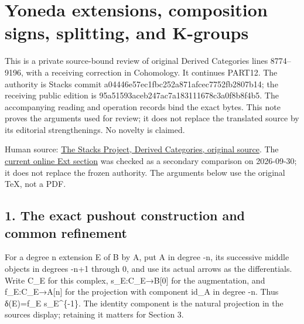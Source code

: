 \section{\texorpdfstring{Yoneda extensions,\allowbreak{} composition signs,\allowbreak{} splitting,\allowbreak{} and K-groups}{Yoneda  composition   and K-groups}}\label{proofs-8774-9196-yoneda-extensions-composition-signs-splitting-and-k-groups}

This is a private source-bound review of original Derived Categories lines 8774–\allowbreak{}9196,\allowbreak{} with a receiving correction in Cohomology. It continues PART12. The authority is Stacks commit a04446e5\allowbreak{}7ec1fbc2\allowbreak{}52a871af\allowbreak{}cec7752f\allowbreak{}b2807b14; the receiving public edition is 95a51593\allowbreak{}aceb247a\allowbreak{}c7a18311\allowbreak{}1678c3a0\allowbreak{}f8b8f4b5. The accompanying reading and operation records bind the exact bytes. This note proves the arguments used for review; it does not replace the translated source by its editorial strengthenings. No novelty is claimed.

Human source:\allowbreak{} \href{https://github.com/stacks/stacks-project/blob/a04446e57ec1fbc252a871afcec7752fb2807b14/derived.tex\#L8774}{The Stacks Project,\allowbreak{} Derived Categories,\allowbreak{} original source}. The \href{https://stacks.math.columbia.edu/tag/06XP}{current online Ext section} was checked as a secondary comparison on 2026-09-30; it does not replace the frozen authority. The arguments below use the original TeX,\allowbreak{} not a PDF.

\subsection{1. The exact pushout construction and common refinement}\label{proofs-8774-9196-the-exact-pushout-construction-and-common-refinement}

For a degree n extension E of B by A,\allowbreak{} put A in degree -n,\allowbreak{} its successive middle objects in degrees -n\allowbreak{}+1 through 0,\allowbreak{} and use its actual arrows as the differentials. Write C\_\allowbreak{}E for this complex,\allowbreak{} s\_\allowbreak{}E:\allowbreak{}C\_\allowbreak{}E\allowbreak{}→B[0]\allowbreak{} for the augmentation,\allowbreak{} and f\_\allowbreak{}E:\allowbreak{}C\_\allowbreak{}E\allowbreak{}→A[n]\allowbreak{} for the projection with component id\_\allowbreak{}A in degree -n. Thus δ(E)\allowbreak{}\allowbreak{}=f\_\allowbreak{}E s\_\allowbreak{}E\textasciicircum{}\{-1\}. The identity component is the natural projection in the source\textquotesingle s display; retaining it matters for Section 3.

